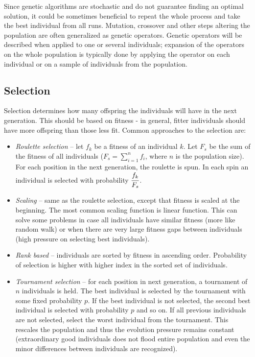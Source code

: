 Since genetic algorithms are stochastic and do not guarantee finding an optimal solution, it could be sometimes beneficial to repeat the whole process and take the best individual from all runs.
Mutation, crossover and other steps altering the population are often generalized as genetic operators. Genetic operators will be described when applied to one or several individuals; expansion of the operators on the whole population is typically done by applying the operator on each individual or on a sample of individuals from the population.

\subsection{Selection}
Selection determines how many offspring the individuals will have in the next generation. This should be based on fitness - in general, fitter individuals should have more offspring than those less fit. Common approaches to the selection are:
\begin{itemize}
	\item \emph{Roulette selection} – let $f_k$ be a fitness of an individual $k$. Let $F_s$ be the sum of the fitness of all individuals ($F_s = \sum_{i=1}^{n}f_i$, where $n$ is the population size). For each position in the next generation, the roulette is spun. In each spin an individual is selected with probability $\cfrac{f_k}{F_s}$.
	\item \emph{Scaling} – same as the roulette selection, except that fitness is scaled at the beginning. The most common scaling function is linear function. This can solve some problems in case all individuals have similar fitness (more like random walk) or when there are very large fitness gaps between individuals (high pressure on selecting best individuals).
	\item \emph{Rank based} – individuals are sorted by fitness in ascending order. Probability of selection is higher with higher index in the sorted set of individuals.
	\item \emph{Tournament selection} – for each position in next generation, a tournament of $n$ individuals is held. The best individual is selected by the tournament with some fixed probability $p$. If the best individual is not selected, the second best individual is selected with probability $p$ and so on. If all previous individuals are not selected, select the worst individual from the tournament. This rescales the population and thus the evolution pressure remains constant (extraordinary good individuals does not flood entire population and even the minor differences between individuals are recognized).
\end{itemize}

